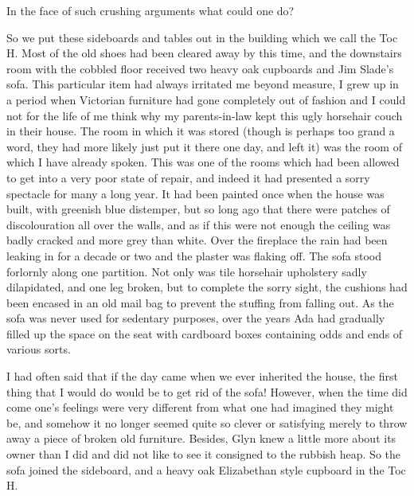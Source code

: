 In the face of such crushing arguments what could one do?

So we put these sideboards and tables out in the building which we call the Toc H. Most of the old shoes had been cleared away by this time, and the downstairs room with the cobbled floor received two heavy oak cupboards and Jim Slade's sofa. This particular item had always irritated me beyond measure, I grew up in a period when Victorian furniture had gone completely out of fashion and I could not for the life of me think why my parents-in-law kept this ugly horsehair couch in their house. The room in which it was stored (though  is perhaps too grand a word, they had more likely just put it there one day, and left it) was the  room of which I have already spoken. This was one of the rooms which had been allowed to get into a very poor state of repair, and indeed it had presented a sorry spectacle for many a long year. It had been painted once when the house was built, with greenish blue distemper, but so long ago that there were patches of discolouration all over the walls, and as if this were not enough the ceiling was badly cracked and more grey than white. Over the fireplace the rain had been leaking in for a decade or two and the plaster was flaking off. The sofa stood forlornly along one partition. Not only was tile horsehair upholstery sadly dilapidated, and one leg broken, but to complete the sorry sight, the cushions had been encased in an old mail bag to prevent the stuffing from falling out. As the sofa was never used for sedentary purposes, over the years Ada had gradually filled up the space on the seat with cardboard boxes containing odds and ends of various sorts.

I had often said that if the day came when we ever inherited the house, the first thing that I would do would be to get rid of the sofa! However, when the time did come one's feelings were very different from what one had imagined they might be, and somehow it no longer seemed quite so clever or satisfying merely to throw away a piece of broken old furniture. Besides, Glyn knew a little more about its owner than I did and did not like to see it consigned to the rubbish heap. So the sofa joined the sideboard, and a heavy oak Elizabethan style cupboard in the Toc H.

